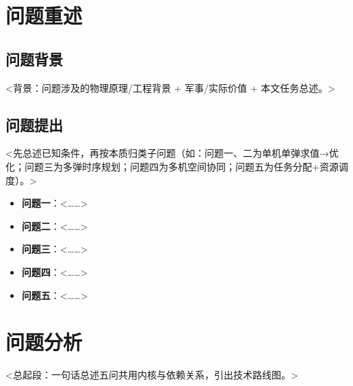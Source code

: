 \documentclass[11pt]{ctexart}
\begin{document}
\section{问题重述}
\subsection{问题背景}
<背景：问题涉及的物理原理/工程背景 + 军事/实际价值 + 本文任务总述。>

\subsection{问题提出}
<先总述已知条件，再按本质归类子问题（如：问题一、二为单机单弹求值→优化；问题三为多弹时序规划；问题四为多机空间协同；问题五为任务分配+资源调度）。>

\begin{itemize}[leftmargin=2em,itemsep=1pt,label={}]
\item \textbf{问题一}：<……>
\item \textbf{问题二}：<……>
\item \textbf{问题三}：<……>
\item \textbf{问题四}：<……>
\item \textbf{问题五}：<……>
\end{itemize}

\section{问题分析}
<总起段：一句话总述五问共用内核与依赖关系，引出技术路线图。>


\end{document}
